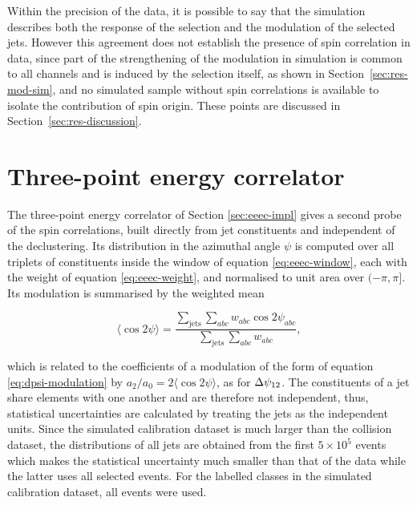 Within the precision of the data, it is possible to say that the simulation describes both
the response of the selection and the modulation of the selected jets. However this
agreement does not establish the presence of spin correlation in data, since 
part of the strengthening of the modulation in simulation is common to all
channels and is induced by the selection itself, as shown in
Section~\ref{sec:res-mod-sim}, and no simulated sample without spin correlations is
available to isolate the contribution of spin origin. These points are discussed
in Section~\ref{sec:res-discussion}.

\section{Three-point energy correlator}
\label{sec:res-eeec}

The three-point energy correlator of Section \ref{sec:eeec-impl} gives a second probe of
the spin correlations, built directly from jet constituents and independent of the declustering.
Its distribution in the azimuthal angle $\psi$ is computed over
all triplets of constituents inside the window of equation \eqref{eq:eeec-window}, each
with the weight of equation \eqref{eq:eeec-weight}, and normalised to unit area over
$(-\pi,\pi]$. Its modulation is summarised by the weighted mean

\begin{equation}
  \langle \cos 2\psi \rangle =
  \frac{\sum_{\text{jets}} \sum_{abc} w_{abc} \cos 2\psi_{abc}}
       {\sum_{\text{jets}} \sum_{abc} w_{abc}} ,
  \label{eq:eeec-mean}
\end{equation}

which is related to the coefficients of a modulation of the form of
equation \eqref{eq:dpsi-modulation} by $a_2/a_0 = 2\langle \cos 2\psi \rangle$, as for
$\Delta\psi_{12}$. The constituents of a jet share elements with one another and are therefore 
not independent, thus, statistical uncertainties are calculated by treating the jets 
as the independent units. Since the simulated calibration dataset is much larger than 
the collision dataset, the distributions of all jets
are obtained from the first $5 \times 10^{5}$ events which makes 
the statistical uncertainty much smaller than that of the data while the latter uses 
all selected events. For the labelled classes in the simulated calibration dataset,
all events were used.

